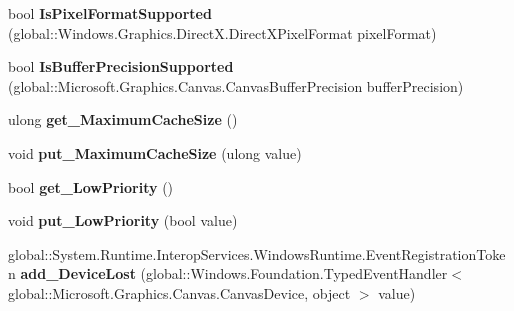 \begin{DoxyCompactItemize}
bool {\bfseries Is\+Pixel\+Format\+Supported} (global\+::\+Windows.\+Graphics.\+Direct\+X.\+Direct\+X\+Pixel\+Format pixel\+Format)
\item 
\mbox{\label{interface_microsoft_1_1_graphics_1_1_canvas_1_1_i_canvas_device_acfa5f7ea5e23895e632195b070bb4023}} 
bool {\bfseries Is\+Buffer\+Precision\+Supported} (global\+::\+Microsoft.\+Graphics.\+Canvas.\+Canvas\+Buffer\+Precision buffer\+Precision)
\item 
\mbox{\label{interface_microsoft_1_1_graphics_1_1_canvas_1_1_i_canvas_device_a4004fcfc71e1035a4e3e56590d32a11a}} 
ulong {\bfseries get\+\_\+\+Maximum\+Cache\+Size} ()
\item 
\mbox{\label{interface_microsoft_1_1_graphics_1_1_canvas_1_1_i_canvas_device_a3812c813e00bdc30b376b38962b40ba7}} 
void {\bfseries put\+\_\+\+Maximum\+Cache\+Size} (ulong value)
\item 
\mbox{\label{interface_microsoft_1_1_graphics_1_1_canvas_1_1_i_canvas_device_a8e974c9c2295757c25f1c270c662d0df}} 
bool {\bfseries get\+\_\+\+Low\+Priority} ()
\item 
\mbox{\label{interface_microsoft_1_1_graphics_1_1_canvas_1_1_i_canvas_device_a82a3e875104020e0b8e886b72df60554}} 
void {\bfseries put\+\_\+\+Low\+Priority} (bool value)
\item 
\mbox{\label{interface_microsoft_1_1_graphics_1_1_canvas_1_1_i_canvas_device_a883498a6511789a253e054e8db8972ac}} 
global\+::\+System.\+Runtime.\+Interop\+Services.\+Windows\+Runtime.\+Event\+Registration\+Token {\bfseries add\+\_\+\+Device\+Lost} (global\+::\+Windows.\+Foundation.\+Typed\+Event\+Handler$<$ global\+::\+Microsoft.\+Graphics.\+Canvas.\+Canvas\+Device, object $>$ value)
\item 
\mbox{\label{interface_microsoft_1_1_graphics_1_1_canvas_1_1_i_canvas_device_a4423eb62fed2e41b1e8429993ad3b1f1}} 

\end{DoxyCompactItemize}
